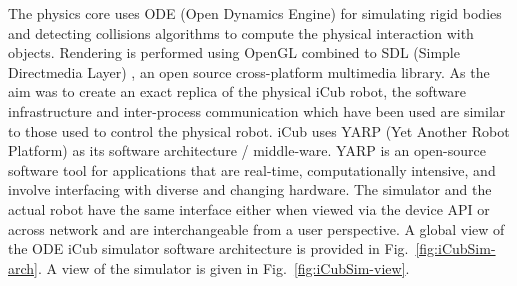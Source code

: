 \documentclass[12pt,a4paper,twoside]{article}
\begin{document}
The physics core uses ODE (Open Dynamics Engine) \cite{ODE} for simulating rigid bodies and detecting collisions algorithms to compute the physical interaction with objects. Rendering is performed using OpenGL combined to SDL (Simple Directmedia Layer) \cite{SDL}, an open source cross-platform multimedia library. As the aim was to create an exact replica of the physical iCub robot, the software infrastructure and inter-process communication which have been used are similar to those used to control the physical robot. iCub uses YARP (Yet Another Robot Platform) \cite{metta2006yarp} as its software architecture / middle-ware. YARP is an open-source software tool for applications that are real-time, computationally intensive, and involve interfacing with diverse and changing hardware. The simulator and the actual robot have the same interface either when viewed via the device API or across network and are interchangeable from a user perspective. A global view of the ODE iCub simulator software architecture is provided in Fig.~\ref{fig:iCubSim-arch}. A view of the simulator is given in Fig.~\ref{fig:iCubSim-view}.
\end{document}
